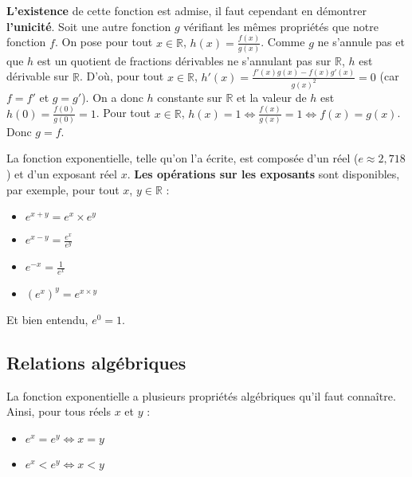 	\begin{demonstration}[Existence]
		\textbf{L'existence} de cette fonction est admise, il faut cependant en démontrer \textbf{l'unicité}.
		\newpar
		Soit une autre fonction $g$ vérifiant les mêmes propriétés que notre fonction $f$. On pose pour tout $x \in \mathbb{R}$, $h(x) = \frac{f(x)}{g(x)}$.
		\newpar
		Comme $g$ ne s'annule pas et que $h$ est un quotient de fractions dérivables ne s'annulant pas sur $\mathbb{R}$, $h$ est dérivable sur $\mathbb{R}$.
		\newpar
		D'où, pour tout $x \in \mathbb{R}$, $h'(x) = \frac{f'(x)g(x) - f(x)g'(x)}{g(x)^2} = 0$ (car $f = f'$ et $g = g'$).
		\newpar
		On a donc $h$ constante sur $\mathbb{R}$ et la valeur de $h$ est $h(0) = \frac{f(0)}{g(0)} = 1$.
		\newpar
		Pour tout $x \in \mathbb{R}$, $h(x) = 1 \iff \frac{f(x)}{g(x)} = 1 \iff f(x) = g(x)$. Donc $g = f$.
	\end{demonstration}

	\begin{tip}[Formules]
		La fonction exponentielle, telle qu'on l'a écrite, est composée d'un réel ($e \approx 2,718 $) et d'un exposant réel $x$. \textbf{Les opérations sur les exposants} sont disponibles, par exemple, pour tout $x$, $y \in \mathbb{R}$ :
		\begin{itemize}
			\item $e^{x+y} = e^x \times e^y$
			\item $e^{x-y} = \displaystyle{\frac{e^x}{e^y}}$
			\item $e^{-x} = \displaystyle{\frac{1}{e^x}}$
			\item $(e^x)^y = e^{x \times y}$
		\end{itemize}
		Et bien entendu, $e^0 = 1$.
	\end{tip}

	\subsection{Relations algébriques}

	\begin{formula}
		La fonction exponentielle a plusieurs propriétés algébriques qu'il faut connaître. Ainsi, pour tous réels $x$ et $y$ :
		\begin{itemize}
			\item $e^x = e^y \iff x = y$
			\item $e^x \lt e^y \iff x \lt y$
		\end{itemize}
	\end{formula}


